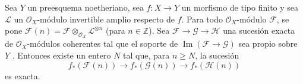 
\begin{corollary}[2.2.4]
\label{III.2.2.4}
\label{III.2.2.4-fr}
Sea $Y$ un preesquema noetheriano, sea $f:X\to Y$ un morfismo de tipo finito y sea $\mathcal L$ un $\mathcal O_X$-módulo invertible amplio respecto de $f$.
Para todo $\mathcal O_X$-módulo $\mathcal F$, se pone
$\mathcal F(n)=\mathcal F\otimes_{\mathcal O_X}\mathcal L^{\otimes n}$
(para $n\in\mathbb Z$). Sea
$\mathcal F\to\mathcal G\to\mathcal H$
una sucesión exacta de $\mathcal O_X$-módulos coherentes tal que el soporte de $\operatorname{Im}(\mathcal F\to\mathcal G)$ sea propio sobre $Y$ \textup{}.
Entonces existe un entero $N$ tal que, para $n\geq N$, la sucesión
\[
f_*(\mathcal F(n))\longrightarrow f_*(\mathcal G(n))
\longrightarrow f_*(\mathcal H(n))
\]
es exacta.
\end{corollary}

